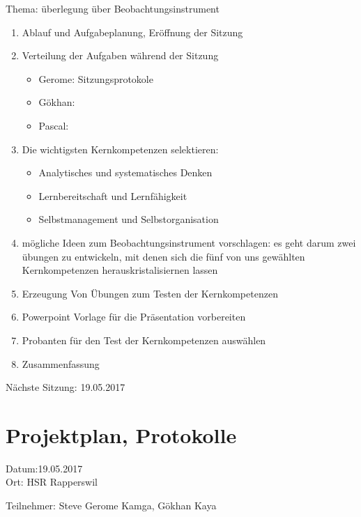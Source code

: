 Thema: überlegung über Beobachtungsinstrument
\begin{enumerate}

\item Ablauf und Aufgabeplanung, Eröffnung der Sitzung 

\item  Verteilung der Aufgaben während der Sitzung
\begin{itemize}
\item Gerome: Sitzungsprotokole
\item Gökhan: 
\item Pascal: 
\end{itemize}


\item  Die wichtigsten Kernkompetenzen selektieren:
\begin{itemize}
\item Analytisches und systematisches Denken
\item Lernbereitschaft und Lernfähigkeit
\item Selbstmanagement und Selbstorganisation 
\end{itemize}

\item mögliche Ideen zum Beobachtungsinstrument vorschlagen: es geht darum zwei übungen zu entwickeln,  mit denen sich die fünf von uns gewählten Kernkompetenzen herauskristalisiernen lassen

\item Erzeugung Von Übungen zum Testen der Kernkompetenzen

\item Powerpoint Vorlage für die Präsentation vorbereiten	

\item Probanten für den Test der Kernkompetenzen auswählen


\item Zusammenfassung

\end{enumerate}

Nächste Sitzung: 19.05.2017

\newpage
\section*{Projektplan, Protokolle}

Datum:19.05.2017\\

Ort: HSR Rapperswil

Teilnehmer: Steve Gerome Kamga, Gökhan Kaya\\

